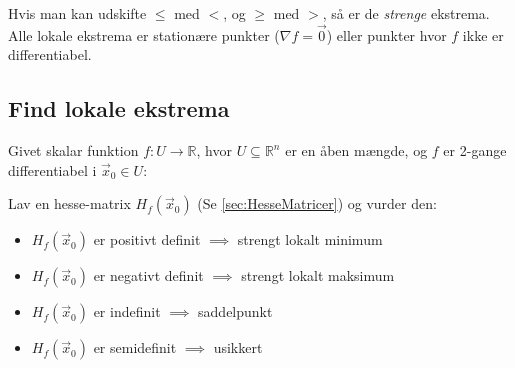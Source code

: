 Hvis man kan udskifte $\le$ med $<$, og $\ge$ med $>$, så er de \emph{strenge} ekstrema. \\

Alle lokale ekstrema er stationære punkter ($\nabla f = \vec 0$) eller punkter hvor $f$ ikke er differentiabel.


\subsection{Find lokale ekstrema}

Givet skalar funktion $f: U \to \mathbb R$, hvor $U \subseteq \mathbb R^n$ er en åben mængde, og $f$ er 2-gange differentiabel i $\vec x_0 \in U$:

Lav en hesse-matrix $H_f(\vec x_0)$ (Se \autoref{sec:HesseMatricer}) og vurder den:
\begin{itemize}
    \item $H_f(\vec x_0)$ er positivt definit $\implies$ strengt lokalt minimum
    \item $H_f(\vec x_0)$ er negativt definit $\implies$ strengt lokalt maksimum
    \item $H_f(\vec x_0)$ er indefinit $\implies$ saddelpunkt
    \item $H_f(\vec x_0)$ er semidefinit $\implies$ usikkert
\end{itemize}
